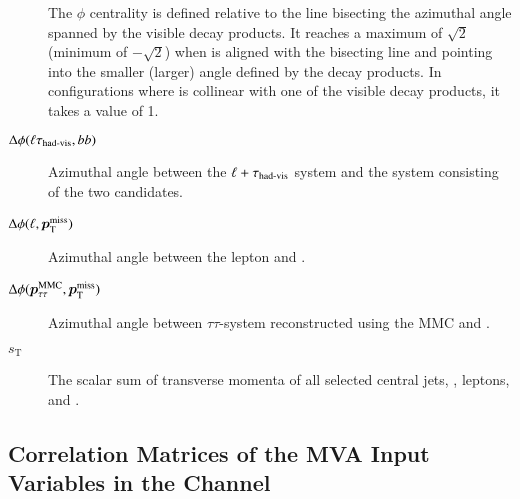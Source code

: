 \begin{description}
  The \pTmiss $\phi$ centrality is defined relative to the line bisecting the
  azimuthal angle spanned by the visible \taulepton decay products. It reaches a
  maximum of $\sqrt{2}$ (minimum of $-\sqrt{2}$) when \pTmiss is aligned with
  the bisecting line and pointing into the smaller (larger) angle defined by the
  decay products. In configurations where \pTmiss is collinear with one of the
  visible \taulepton decay products, it takes a value of 1.

\item[$\Delta\phi(\ell\tau_{\text{had-vis}}, bb)$] Azimuthal angle between the
  $\ell + \tau_{\text{had-vis}}$ system and the system consisting of the two \bjet
  candidates.

\item[$\Delta\phi(\ell, \bm{p}_{\text{T}}^{\text{miss}})$] Azimuthal angle between the lepton and
  \pTmiss.

\item[$\Delta\phi(\bm{p}_{\tau\tau}^\text{MMC}, \bm{p}_{\text{T}}^{\text{miss}})$] Azimuthal angle between $\tau\tau$-system
  reconstructed using the MMC and \pTmiss.

\item[$s_{\text{T}}$] The scalar sum of transverse momenta of all selected
  central jets, \tauhadvis, leptons, and \pTmissAbs.

\end{description}


\clearpage
\subsection{Correlation Matrices of the MVA Input Variables in the \hadhad
  Channel}

